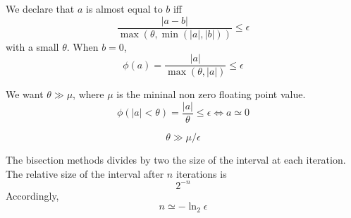 \documentclass[aps,12pt]{revtex4}
\begin{document}
We declare that $a$ is almost equal to $b$ iff
\begin{equation}
	\dfrac{\vert a - b \vert}{ \max(\theta,\min(\vert a \vert,\vert b \vert)) } \leq \epsilon
\end{equation}
with a small $\theta$.
When $b=0$, 
\begin{equation}
	\phi(a) = \dfrac{\vert a \vert }{ \max(\theta,\vert a \vert) } \leq \epsilon
\end{equation}

We want $\theta \gg \mu$, where $\mu$ is the mininal non zero floating point value.
\begin{equation}
\phi(|a|<\theta) = \dfrac{|a|}{\theta} \leq \epsilon \iff a \simeq 0
\end{equation}

\begin{equation}
	\theta \gg \mu / \epsilon
\end{equation} 	

\vspace{3cm}



The bisection methods divides by two the size of the interval at each iteration.
The relative size of the interval after $n$ iterations is
$$
	 2^{-n}
$$
Accordingly, 
$$
	n \simeq -\ln_2 \epsilon
$$
\end{document}
